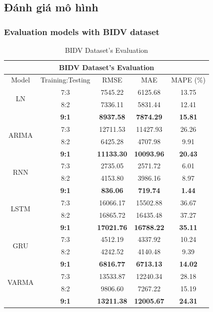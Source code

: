 \subsection{Đánh giá mô hình} 
\subsubsection{Evaluation models with BIDV dataset}
\begin{table}[H]
    \centering
    \caption{BIDV Dataset's Evaluation}
    \begin{tabular}{|c|c|c|c|c|}
         \hline
         \multicolumn{5}{|c|}{\textbf{BIDV Dataset's Evaluation}}\\
         \hline
         \centering Model & Training:Testing & RMSE & MAE & MAPE (\%)\\
         \hline
         \multirow{2}{*}{LN} & 7:3 & 7545.22&6125.68&13.75 \\ & 8:2 & 7336.11&5831.44&12.41 \\ & \textbf{9:1} & \textbf{8937.58} & \textbf{7874.29} & \textbf{15.81}\\
         \hline
         \multirow{2}{*}{ARIMA} & 7:3 & 12711.53&11427.93&26.26\\ & 8:2 & 6425.28&4707.98&9.91 \\ & \textbf{9:1} & \textbf{11133.30} & \textbf{10093.96} & \textbf{20.43}\\
         \hline
         \multirow{2}{*}{RNN} & 7:3 & 2735.05&2571.72&6.01\\ & 8:2 & 4153.80&3986.16&8.97 \\ & \textbf{9:1} & \textbf{836.06} & \textbf{719.74} & \textbf{1.44}\\
         \hline
         \multirow{2}{*}{LSTM} & 7:3 & 16066.17&15502.88&36.67\\ & 8:2 & 16865.72&16435.48&37.27 \\ & \textbf{9:1} & \textbf{17021.76} & \textbf{16788.22} & \textbf{35.11}\\
         \hline
         \multirow{2}{*}{GRU} & 7:3 & 4512.19&4337.92&10.24\\ & 8:2 & 4242.52&4140.48&9.39 \\ & \textbf{9:1} & \textbf{6816.77} & \textbf{6713.13} & \textbf{14.02}\\
         \hline
         \multirow{2}{*}{VARMA} & 7:3 & 13533.87&12240.34&28.18\\ & 8:2 & 9806.60&7267.22&15.19 \\ & \textbf{9:1} & \textbf{13211.38} & \textbf{12005.67} & \textbf{24.31}\\       

\end{tabular}
\end{table}
